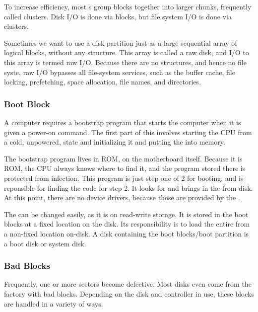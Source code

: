 To increase efficiency, most s group blocks together into larger chunks, frequently called clusters.
Disk I/O is done via blocks, but file system I/O is done via clusters.

Sometimes we want to use a disk partition just as a large sequential array of logical blocks, without any structure.
This array is called a raw disk, and I/O to this array is termed raw I/O.
Because there are no structures, and hence no file syste, raw I/O bypasses all file-system services, such as the buffer cache, file locking, prefetching, space allocation, file names, and directories.

\subsubsection{Boot Block}\label{subsubsec:Boot_Block}
A computer requires a bootstrap program that starts the computer when it is given a power-on command.
The first part of this involves starting the CPU from a cold, unpowered, state and initializing it and putting the  into memory.

The bootstrap program lives in ROM, on the motherboard itself.
Because it is ROM, the CPU always knows where to find it, and the program stored there is protected from infection.
This program is just step one of 2 for booting, and is reponsible for finding the code for step 2.
It looks for and brings in the  from disk.
At this point, there are no device drivers, because those are provided by the .

The  can be changed easily, as it is on read-write storage.
It is stored in the boot blocks at a fixed location on the disk.
Its responsibility is to load the entire  from a non-fixed location on-disk.
A disk containing the boot blocks/boot partition is a boot disk or system disk.

\subsubsection{Bad Blocks}\label{subsubsec:Bad_Blocks}
Frequently, one or more sectors become defective.
Most disks even come from the factory with bad blocks.
Depending on the disk and controller in use, these blocks are handled in a variety of ways.


